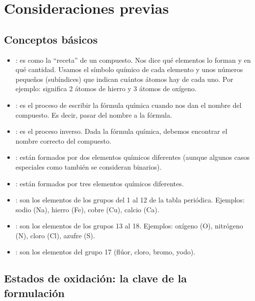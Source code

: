 
\section{Consideraciones previas}

\subsection{Conceptos básicos}
\begin{itemize}
    \item {}: es como la ``receta'' de un compuesto. Nos dice qué elementos lo forman y en qué cantidad. Usamos el símbolo químico de cada elemento y unos números pequeños (subíndices) que indican cuántos átomos hay de cada uno. Por ejemplo:  significa 2 átomos de hierro y 3 átomos de oxígeno.

    \item {}: es el proceso de escribir la fórmula química cuando nos dan el nombre del compuesto. Es decir, pasar del nombre a la fórmula.

    \item {}: es el proceso inverso. Dada la fórmula química, debemos encontrar el nombre correcto del compuesto.

    \item {}: están formados por dos elementos químicos diferentes (aunque algunos casos especiales como  también se consideran binarios).

    \item {}: están formados por tres elementos químicos diferentes.

    \item {}: son los elementos de los grupos del 1 al 12 de la tabla periódica. Ejemplos: sodio (Na), hierro (Fe), cobre (Cu), calcio (Ca).

    \item {}: son los elementos de los grupos 13 al 18. Ejemplos: oxígeno (O), nitrógeno (N), cloro (Cl), azufre (S).

    \item {}: son los elementos del grupo 17 (flúor, cloro, bromo, yodo).
\end{itemize}

\subsection{Estados de oxidación: la clave de la formulación}

